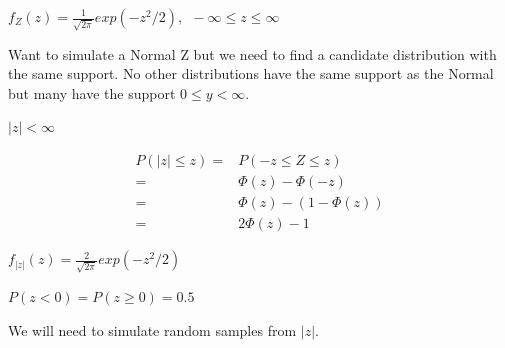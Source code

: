 \documentclass[11pt]{article}
\begin{document}
\(f_Z (z) = \frac{1}{\sqrt {2 \pi}} exp(-z^2/2), \ \ - \infty \leq z \leq \infty\)

Want to simulate a Normal Z but we need to find a candidate distribution with
the same support. No other distributions have the same support as the Normal but
many have the support \(0 \leq y < \infty\).

\(|z| < \infty\)

\begin{equation}
\begin{split}
P(|z| \leq z) = & P(-z \leq Z \leq z)\\
= & \Phi (z) - \Phi(-z)\\
= & \Phi (z) - (1 - \Phi (z))\\
= & 2 \Phi (z) - 1
\end{split}
\end{equation}

\(f_{|z|} (z) = \frac{2}{\sqrt{2 \pi}} exp(- z^2/2)\)

\(P(z < 0) = P(z \geq 0) = 0.5\)

We will need to simulate random samples from \(|z|\).
\end{document}
